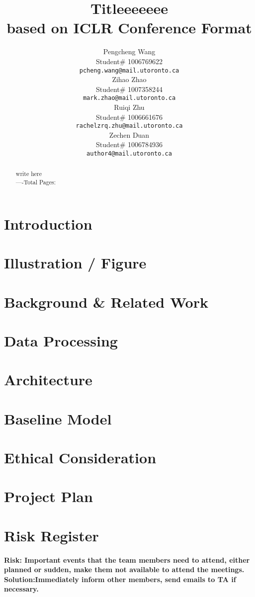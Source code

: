 \documentclass{article}
\title{Titleeeeeee  \\ 
based on ICLR Conference Format}
\author{Pengcheng Wang  \\
Student\# 1006769622\\
\texttt{pcheng.wang@mail.utoronto.ca} \\
\And
Zihao Zhao  \\
Student\# 1007358244 \\
\texttt{mark.zhao@mail.utoronto.ca} \\
\AND
Ruiqi Zhu  \\
Student\# 1006661676 \\
\texttt{rachelzrq.zhu@mail.utoronto.ca} \\
\And
Zechen Duan \\
Student\# 1006784936 \\
\texttt{author4@mail.utoronto.ca} \\
\AND
}
\begin{document}
\maketitle

\begin{abstract}
write here\\
----Total Pages: \pageref{last_page}
\end{abstract}


\section{Introduction}

\section{Illustration / Figure}

\section{Background & Related Work}

\section{Data Processing}

\section{Architecture}

\section{Baseline Model}

\section{Ethical Consideration}

\section{Project Plan}

\section{Risk Register}
\paragraph
{
Risk: Important events that the team members need to attend, either planned or sudden, make them not available to attend the meetings.\\
Solution:Immediately inform other members, send emails to TA if necessary.
}
\end{document}
